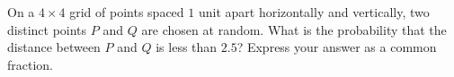 On a $4\times4$ grid of points spaced $1$ unit apart horizontally and vertically, two distinct points $P$ and $Q$ are chosen at random. What is the probability that the distance between $P$ and $Q$ is less than $2.5$? Express your answer as a common fraction.
